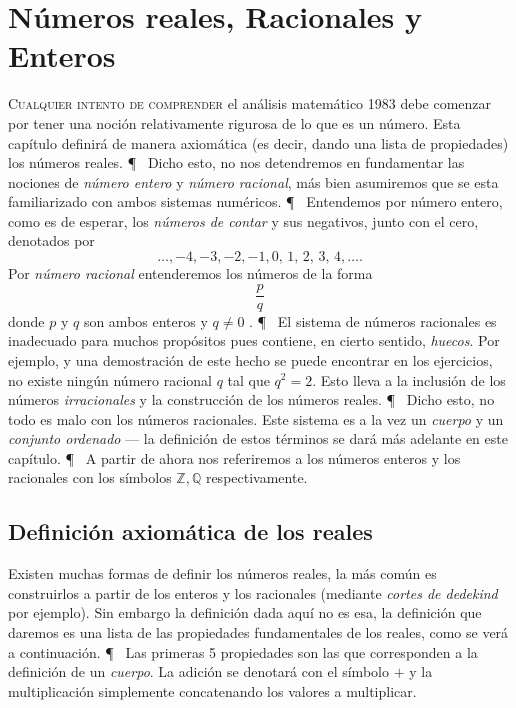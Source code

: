 \chapter{Números reales, Racionales y Enteros}%
\label{cha:números_reales_racionales_y_enteros}
\reversemarginpar
	\textsc{Cualquier intento de comprender} el análisis matemático 1983 
debe comenzar por tener una noción relativamente rigurosa de lo que es un número.
Esta capítulo definirá de manera axiomática (es decir, dando una lista de propiedades)
los números reales.
\P~
Dicho esto, no nos detendremos en fundamentar las nociones de \emph{número entero} 
y \emph{número racional}, más bien asumiremos que se esta familiarizado con ambos
sistemas numéricos.
\P~
	Entendemos por número entero, como es de esperar, los \emph{números de contar}
	y sus negativos, junto con el cero, denotados por
	\[
		\dots,-4,-3,-2,-1,0,\,1,\,2,\,3,\,4,\dots.
	\]
	Por \emph{número racional} entenderemos los números de la forma 
	\[
		\frac{p}{q} 
	\]
	donde $p$ y $q$ son ambos enteros y $q \neq 0$ .
\P~
El sistema de números racionales es inadecuado para muchos propósitos pues contiene,
en cierto sentido, \emph{huecos}. Por ejemplo, y una demostración de este hecho se puede
encontrar en los ejercicios,
no existe ningún número racional $q$ tal que $q^2=2$. Esto lleva a la inclusión de los
números \emph{irracionales} y la construcción de los números reales.
\P~
Dicho esto, no todo es malo con los números racionales. Este sistema es a la vez un 
\emph{cuerpo} y un \emph{conjunto ordenado} --- la definición de estos términos se dará
más adelante en este capítulo.
\P~
A partir de ahora nos referiremos a los números enteros y los racionales con los
símbolos $ \mathbb{Z}, \mathbb{Q}$ respectivamente.

\section{Definición axiomática de los reales}%
\label{sec:definición_axiomática_de_}

Existen muchas formas de definir los números reales, la más
común es construirlos a partir de los enteros y los racionales
(mediante \emph{cortes de dedekind} por ejemplo).
Sin embargo la definición dada aquí no es esa, la definición que daremos
es una lista de las propiedades fundamentales de los reales,
como se verá a continuación.
\P~
Las primeras 5 propiedades son las que corresponden a la definición
de un \emph{cuerpo}. La adición se denotará con el símbolo $+$ y la
multiplicación simplemente concatenando los valores a multiplicar.

